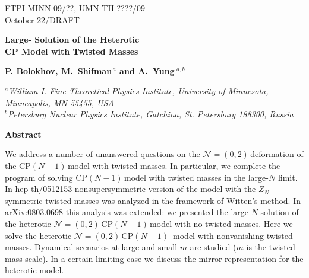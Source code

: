 \documentclass[epsfig,12pt]{article}
\newcommand{\nzt}{${\mathcal N}=(0,2)\,$}
\newcommand{\cpn}{CP$(N-1)\,$}
\begin{document}


\begin{titlepage}

\begin{flushright}
FTPI-MINN-09/??, UMN-TH-????/09\\
October 22/DRAFT
\end{flushright}

\vspace{1cm}

\begin{center}
{  \Large \bf  Large- Solution of the Heterotic\\[2mm]
 CP Model with Twisted Masses}
\end{center}



\vspace{1mm}

\begin{center}

 {\large
 \bf   P. Bolokhov,  M.~Shifman$^{\,a}$ and \bf A.~Yung$^{\,\,a,b}$}
\end {center}

\begin{center}


$^a${\it  William I. Fine Theoretical Physics Institute,
University of Minnesota,
Minneapolis, MN 55455, USA}\\
$^{b}${\it Petersburg Nuclear Physics Institute, Gatchina, St. Petersburg
188300, Russia
}
\end{center}


\begin{center}
{\large\bf Abstract}
\end{center}
We address a number of unanswered questions on the \nzt deformation of the \cpn model with
twisted masses.  In particular, we
complete the program of solving \cpn model with twisted masses in the large-$N$
limit. In hep-th/0512153 nonsupersymmetric version of the model with the $Z_N$
symmetric twisted masses was analyzed in the framework of Witten's method. In arXiv:0803.0698 
this analysis was extended: we presented the 
large-$N$ solution of the heterotic \nzt \cpn model with no twisted masses.
Here we solve the heterotic \nzt \mbox{\cpn}  model with nonvanishing twisted
masses. Dynamical scenarios at large and small $m$ are studied
($m$ is the twisted mass scale).
In a certain limiting case we discuss the mirror representation for the heterotic model.

\vspace{2cm}




\end{titlepage}
\end{document}
